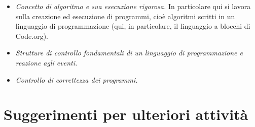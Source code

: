 \begin{itemize}
\item
  \emph{Concetto di algoritmo e sua esecuzione rigorosa.} In particolare qui si lavora sulla creazione ed esecuzione di programmi, cioè algoritmi scritti in un linguaggio di programmazione (qui, in particolare, il linguaggio a blocchi di Code.org).
\item
  \emph{Strutture di controllo fondamentali di un linguaggio di programmazione e reazione agli eventi.}
\item
  \emph{Controllo di correttezza dei programmi.}
\end{itemize}

\section{Suggerimenti per ulteriori attività}\label{suggerimenti-per-ulteriori-attivituxe0-e-riferimenti-4}

\printbibliography[heading=none,keyword={cap7},category={attivita}]

